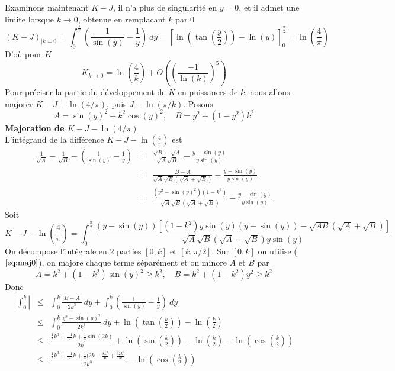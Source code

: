 \documentclass[a4paper,11pt]{book}
\begin{document}
\begin{giacjshere}
Examinons maintenant $K-J$, il n'a plus de singularit\'e en $y=0$, et il admet une limite
lorsque $k \rightarrow 0$, obtenue en remplacant $k$ par 0
\[ (K-J)_{|k=0} = \int_0^{\frac{\pi}{2}} \left(\frac{1}{\sin(y)}-\frac{1}{y}\right)
\ dy = \left[\ln\left(\tan\left(\frac{y}{2}\right)\right) - \ln(y) \right]_0^{\frac{\pi}{2}} =
\ln(\frac{4}{\pi})\]
D'o\`u pour $K$
\[ K_{k \rightarrow 0} = \ln\left(\frac{4}{k}\right) + O( \left(\frac{-1}{\ln(k)}\right)^5)\]
Pour pr\'eciser la partie du d\'eveloppement de $K$ en puissances de $k$, nous allons
majorer $K-J-\ln(4/\pi)$, puis $J-\ln(\pi/k)$.
Posons
\[ A=\sin(y)^2+k^2 \cos(y)^2, \quad B=y^2+(1-y^2)k^2\]
{\bf Majoration de $K-J-\ln(4/\pi)$}\\
L'int\'egrand de la diff\'erence $K-J-\ln(\frac{4}{\pi})$ est
\begin{eqnarray}  
\frac{1}{\sqrt{A}} - \frac{1}{\sqrt{B}} - 
\left( \frac{1}{\sin(y)}-\frac{1}{y} \right)
&= &
\frac{\sqrt{B}-\sqrt{A}}{\sqrt{A} \sqrt{B}} -
\frac{y-\sin(y)}{y\sin(y)} 
 \\
&= &
\frac{B-A}{\sqrt{A} \sqrt{B} (\sqrt{A}+\sqrt{B})} -
\frac{y-\sin(y)}{y\sin(y)} \label{eq:maj0}
 \\
&=& \frac{(y^2-\sin(y)^2)(1-k^2)}{\sqrt{A} \sqrt{B} (\sqrt{A}+\sqrt{B})}
- \frac{y-\sin(y)}{y\sin(y)} \label{eq:maj1}
\end{eqnarray}
Soit
\begin{equation} \label{eq:maj2}
 K-J-\ln(\frac{4}{\pi})= \int_0^{\frac{\pi}{2}} 
\frac{(y-\sin(y))[(1-k^2)y \sin(y)(y+\sin(y))-\sqrt{AB}(\sqrt{A}+\sqrt{B})]}
{\sqrt{A} \sqrt{B} (\sqrt{A}+\sqrt{B})y\sin(y)}
\end{equation}
On décompose l'intégrale en 2 parties $[0,k]$ et $[k,\pi/2]$.
Sur $[0,k]$ on utilise (\(\ref{eq:maj0}\)), on majore chaque terme séparément
et on minore $A$ et $B$ par
\[ A=k^2+(1-k^2)\sin(y)^2 \geq k^2, \quad B=k^2+(1-k^2)y^2 \geq k^2\]
Donc
\begin{eqnarray*} 
| \int_0^{k} | &\leq &\int_0^k \frac{|B-A|}{2k^3} \ dy + \int_0^k ( \frac{1}{\sin(y)}-\frac{1}{y} ) 
\ dy \\
&\leq& \int_0^k \frac{y^2-\sin(y)^2}{2k^3} \ dy + \ln (\tan(\frac{k}{2})) -\ln(\frac{k}{2}) \\
&\leq & \frac{\frac{1}{3} k^{3}+\frac{-1}{2} k+\frac{1}{4} \sin(2 k)}{2 k^{3}} 
+ \ln (\sin(\frac{k}{2})) -\ln(\frac{k}{2}) - \ln (\cos(\frac{k}{2}))
\\
&\leq & \frac{\frac{1}{3} k^{3}+\frac{-1}{2} k+\frac{1}{4} (2k-\frac{8k^3}{6}+\frac{32k^5}{5!}}{2 k^{3}} - \ln (\cos(\frac{k}{2})) \\

\end{eqnarray*}
\end{giacjshere}
\end{document}
